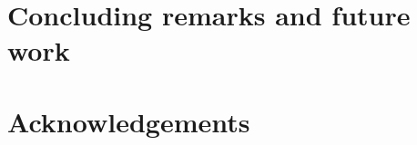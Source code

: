 \documentclass[a4paper, 12pt, titlepage,oneside,drop]{kthesis}
\begin{document}

\chapter{Concluding remarks and future work}

\chapter*{Acknowledgements} 
\end{document}
